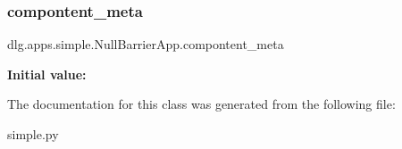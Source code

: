 \subsubsection{\texorpdfstring{compontent\_meta}{compontent\_meta}}
{\footnotesize\ttfamily dlg.\+apps.\+simple.\+Null\+Barrier\+App.\+compontent\+\_\+meta\hspace{0.3cm}{\ttfamily [static]}}

{\bfseries Initial value\+:}
\begin{DoxyCode}{0}

\end{DoxyCode}


The documentation for this class was generated from the following file\+:\begin{DoxyCompactItemize}
\item 
simple.\+py\end{DoxyCompactItemize}
